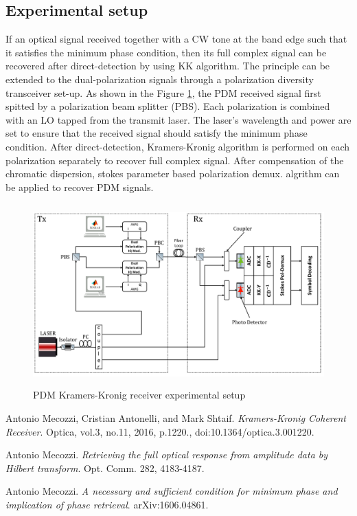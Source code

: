 \subsection{Experimental setup}
If an optical signal received together with a CW tone at the band edge such that it satisfies the minimum phase condition, then its full complex signal can be recovered after direct-detection by using KK algorithm. The principle can be extended to the dual-polarization signals through a polarization diversity transceiver set-up. As shown in the Figure \ref{Practical_setup_TxRx}, the PDM received signal first spitted by a polarization beam splitter (PBS). Each polarization is combined with an LO tapped from the transmit laser. The laser's wavelength and power are set to ensure that the received signal should satisfy the minimum phase condition. After direct-detection, Kramers-Kronig algorithm is performed on each polarization separately to recover full complex signal. After compensation of the chromatic dispersion, stokes parameter based polarization demux. algrithm can be applied to recover PDM signals.     
\begin{figure}[h]
	\centering
	\includegraphics[width=1.0\textwidth, height=7cm]{./sdf/simplified_coherent_receiver/figures/Practical_setup_TxRx.pdf}
	\caption{PDM Kramers-Kronig receiver experimental setup}\label{Practical_setup_TxRx}
\end{figure}


\begin{thebibliography}{9}
	Antonio Mecozzi, Cristian Antonelli, and Mark Shtaif.
	\textit{Kramers-Kronig Coherent Receiver}.
	Optica, vol.3, no.11, 2016, p.1220., doi:10.1364/optica.3.001220.
	
	Antonio Mecozzi.
	\textit{Retrieving the full optical response from amplitude data by Hilbert transform}. Opt. Comm. 282, 4183-4187.
	
	Antonio Mecozzi.
	\textit{A necessary and sufficient condition for minimum phase and implication of phase retrieval}. arXiv:1606.04861.
\end{thebibliography}

